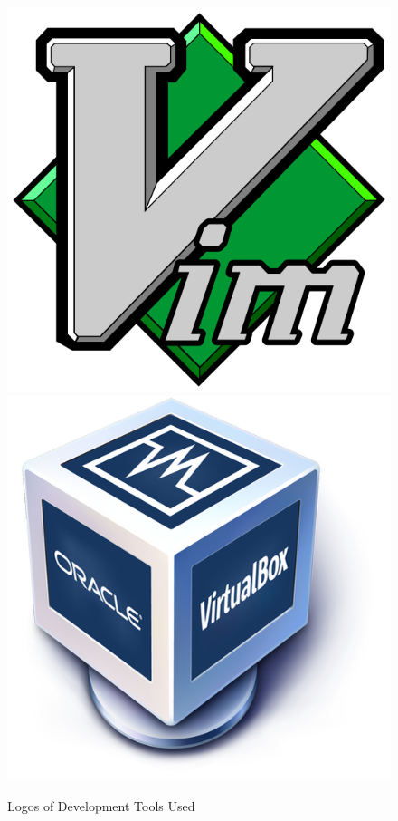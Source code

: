 \begin{figure}[t]
  \includegraphics[height=\developmentToolsLogosHeight]{assets/tools/development/vim.png}
  \includegraphics[height=\developmentToolsLogosHeight]{assets/tools/development/virtualbox.png}
  \caption{Logos of Development Tools Used}
  \label{development_tools_logos}
\end{figure}



